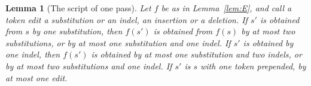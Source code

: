 \documentclass[11pt,a4paper]{article}
\theoremstyle{definition}
\theoremstyle{plain}
\newtheorem{lemma}{Lemma}
\begin{document}

\begin{lemma}[The script of one pass]\label{lem:script}
Let \(f\) be as in Lemma~\ref{lem:E}, and call a token edit a substitution or an indel, an insertion or a deletion. If
\(s'\) is obtained from \(s\) by one substitution, then \(f(s')\) is obtained from \(f(s)\) by at most two
substitutions, or by at most one substitution and one indel. If \(s'\) is obtained by one indel, then \(f(s')\) is
obtained by at most one substitution and two indels, or by at most two substitutions and one indel. If \(s'\) is \(s\)
with one token prepended, by at most one edit.
\end{lemma}
\end{document}
